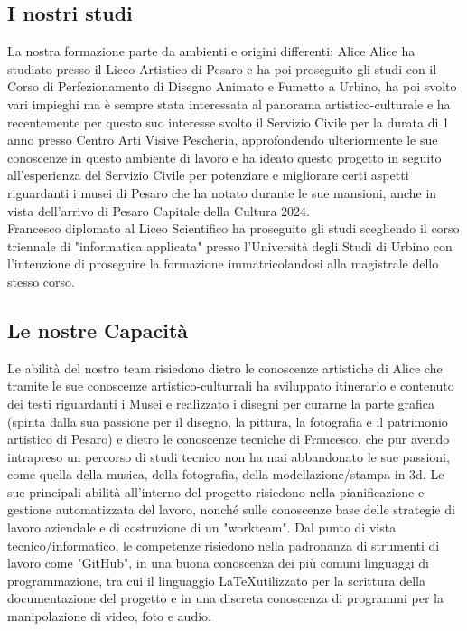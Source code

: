 \documentclass[hidelinks,12pt,a4paper]{article}
\begin{document}
\begin{flushleft}
				\subsection{I nostri studi}
				La nostra formazione parte da ambienti e origini differenti; Alice
				Alice ha studiato presso il Liceo Artistico di Pesaro e ha poi proseguito gli studi con il Corso di Perfezionamento di Disegno Animato e Fumetto a Urbino, ha poi svolto vari impieghi ma è sempre stata interessata al panorama artistico-culturale e ha recentemente per questo suo interesse svolto il Servizio Civile per la durata di 1 anno presso Centro Arti Visive Pescheria, approfondendo ulteriormente le sue conoscenze in questo ambiente di lavoro e ha ideato questo progetto in seguito all'esperienza del Servizio Civile per potenziare e migliorare certi aspetti riguardanti i musei di Pesaro che ha notato durante le sue mansioni, anche in vista dell'arrivo di Pesaro Capitale della Cultura 2024.\\
				Francesco diplomato al Liceo Scientifico ha proseguito gli studi scegliendo il corso triennale di "informatica applicata" presso l'Università degli Studi di Urbino con l'intenzione di proseguire la formazione immatricolandosi alla magistrale dello stesso corso.  
				
				\subsection{Le nostre Capacità}
				Le abilità del nostro team risiedono dietro le conoscenze artistiche di Alice
				che tramite le sue conoscenze artistico-culturrali ha sviluppato itinerario e contenuto dei testi riguardanti i Musei e realizzato i disegni per curarne la parte grafica (spinta dalla sua passione per il disegno, la pittura, la fotografia e il patrimonio artistico di Pesaro)
				e dietro le conoscenze tecniche di Francesco, che pur avendo intrapreso un percorso di studi tecnico non ha mai abbandonato le sue passioni, come quella della musica, della fotografia, della modellazione/stampa in 3d. Le sue principali abilità all'interno del progetto risiedono nella pianificazione e gestione automatizzata del lavoro, nonché sulle conoscenze base delle strategie di lavoro aziendale e di costruzione di un "workteam". Dal punto di vista tecnico/informatico, le competenze risiedono nella padronanza di strumenti di lavoro come "GitHub", in una buona conoscenza dei più comuni linguaggi di programmazione, tra cui il linguaggio \LaTeX utilizzato per la scrittura della documentazione del progetto e in una discreta conoscenza di programmi per la manipolazione di video, foto e audio.
				

\end{flushleft}
\end{document}
